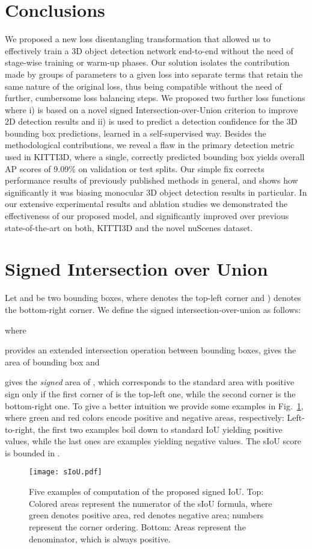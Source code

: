 \documentclass[10pt,twocolumn,letterpaper]{article}
\begin{document}
\section{Conclusions}
We proposed a new loss disentangling transformation that allowed us to effectively train a 3D object detection network end-to-end without the need of stage-wise training or warm-up phases. Our solution isolates the contribution made by groups of parameters to a given loss into separate terms that retain the same nature of the original loss, thus being compatible without the need of further, cumbersome loss balancing steps. We proposed two further loss functions where i) is based on a novel signed Intersection-over-Union criterion to improve 2D detection results and ii) is used to predict a detection confidence for the 3D bounding box predictions, learned in a self-supervised way. Besides the methodological contributions, we reveal a flaw in the primary detection metric used in KITTI3D, where a single, correctly predicted bounding box yields overall AP scores of 9.09\% on validation or test splits. Our simple fix corrects performance results of previously published methods in general, and shows how significantly it was biasing monocular 3D object detection results in particular. In our extensive experimental results and ablation studies we demonstrated the effectiveness of our proposed model, and significantly improved over previous state-of-the-art on both, KITTI3D and the novel nuScenes dataset.

\appendix

\section{Signed Intersection over Union}\label{sec:siou}
Let  and  be two bounding boxes, where  denotes the top-left corner and ) denotes the bottom-right corner.
We define the signed intersection-over-union as follows:

where

provides an extended intersection operation between bounding boxes,  gives the area of bounding box  and

gives the \emph{signed} area of , which corresponds to the standard area with positive sign only if the first corner of  is the top-left one, while the second corner is the bottom-right one. To give a better intuition we provide some examples in Fig.~\ref{fig:sIoU}, where green and red colors encode positive and negative areas, respectively: Left-to-right, the first two examples boil down to standard IoU yielding positive values, while the last ones are examples yielding negative values. The sIoU score is bounded in .
\begin{figure}[ht]
    \centering
    \texttt{[image: sIoU.pdf]}
    \caption{Five examples of computation of the proposed signed IoU. Top: Colored areas represent the numerator of the sIoU formula, where green denotes positive area, red denotes negative area; numbers represent the corner ordering. Bottom: Areas represent the denominator, which is always positive. }
    \label{fig:sIoU}
\end{figure}
\end{document}
